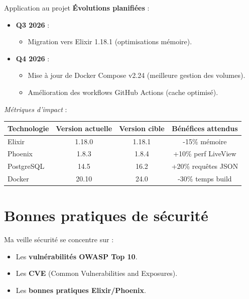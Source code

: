 \begin{for_you}{Application au projet}
    \textbf{Évolutions planifiées} :
    \begin{itemize}
        \item \textbf{Q3 2026} :
              \begin{itemize}
                  \item Migration vers Elixir 1.18.1 (optimisations mémoire).
              \end{itemize}
        \item \textbf{Q4 2026} :
              \begin{itemize}
                  \item Mise à jour de Docker Compose v2.24 (meilleure gestion des volumes).
                  \item Amélioration des workflows GitHub Actions (cache optimisé).
              \end{itemize}
    \end{itemize}

    \textit{Métriques d’impact} :
    \begin{center}
    \begin{tabular}{|l|c|c|c|}
    \hline
    \textbf{Technologie} & \textbf{Version actuelle} & \textbf{Version cible} & \textbf{Bénéfices attendus} \\
    \hline
    Elixir & 1.18.0 & 1.18.1 & -15\% mémoire \\
    Phoenix & 1.8.3 & 1.8.4 & +10\% perf LiveView \\
    PostgreSQL & 14.5 & 16.2 & +20\% requêtes JSON \\
    Docker & 20.10 & 24.0 & -30\% temps build \\
    \hline
    \end{tabular}
    \end{center}
\end{for_you}

\section{Bonnes pratiques de sécurité}
Ma veille sécurité se concentre sur :
\begin{itemize}
    \item Les \textbf{vulnérabilités OWASP Top 10}.
    \item Les \textbf{CVE} (Common Vulnerabilities and Exposures).
    \item Les \textbf{bonnes pratiques Elixir/Phoenix}.
\end{itemize}

